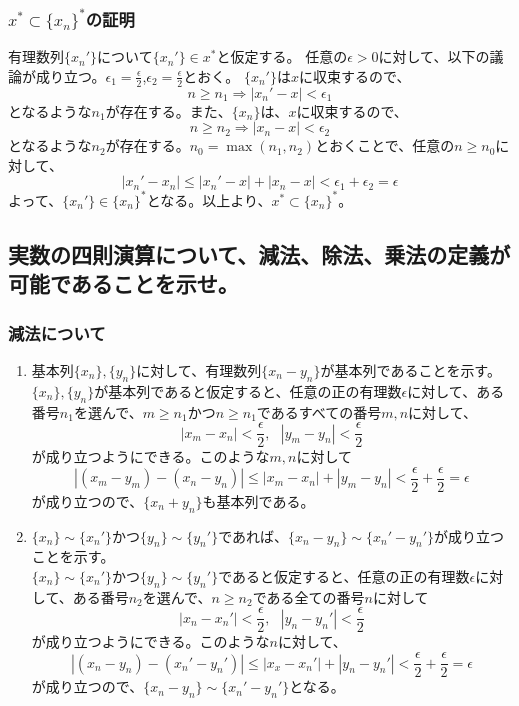 \documentclass{jsarticle}
\begin{document}
\subsubsection{$x^*\subset \{x_n\}^*$の証明}

有理数列$\{x_n'\}$について$\{x_n'\}\in x^*$と仮定する。
任意の$\epsilon>0$に対して、以下の議論が成り立つ。$\epsilon_1=\frac{\epsilon}{2}$,$\epsilon_2=\frac{\epsilon}{2}$とおく。
$\{x_n'\}$は$x$に収束するので、
\[n\geq n_1 \Longrightarrow|x_n'-x|<\epsilon_1\]
となるような$n_1$が存在する。また、$\{x_n\}$は、$x$に収束するので、
\[n\geq n_2 \Longrightarrow|x_n-x|<\epsilon_2\]
となるような$n_2$が存在する。$n_0=\max(n_1,n_2)$とおくことで、任意の$n\geq n_0$に対して、
\[|x_n'-x_n|\leq |x_n'-x|+|x_n-x| < \epsilon_1+\epsilon_2 =\epsilon\]
よって、$\{x_n'\}\in \{x_n\}^*$となる。以上より、$x^*\subset \{x_n\}^*$。



\subsection{実数の四則演算について、減法、除法、乗法の定義が可能であることを示せ。}
\subsubsection{減法について}
\begin{enumerate}
\item
基本列$\{x_n\},\{y_n\}$に対して、有理数列$\{x_n-y_n\}$が基本列であることを示す。\\
$\{x_n\},\{y_n\}$が基本列であると仮定すると、任意の正の有理数$\epsilon$に対して、ある番号$n_1$を選んで、$m\geq n_1$かつ$n\geq n_1$であるすべての番号$m,n$に対して、
\[|x_m-x_n|<\frac{\epsilon}{2},\ \ \ |y_m-y_n|<\frac{\epsilon}{2}\]
が成り立つようにできる。このような$m,n$に対して
\[|(x_m-y_m)-(x_n-y_n)|\leq|x_m-x_n|+|y_m-y_n|< \frac{\epsilon}{2}+\frac{\epsilon}{2}=\epsilon\]
が成り立つので、$\{x_n+y_n\}$も基本列である。

\item
$\{x_n\}\sim\{x_n'\}$かつ$\{y_n\}\sim\{y_n'\}$であれば、$\{x_n-y_n\}\sim\{x_n'-y_n'\}$が成り立つことを示す。\\
$\{x_n\}\sim\{x_n'\}$かつ$\{y_n\}\sim\{y_n'\}$であると仮定すると、任意の正の有理数$\epsilon$に対して、ある番号$n_2$を選んで、$n\geq n_2$である全ての番号$n$に対して
\[|x_n-x_n'|<\frac{\epsilon}{2},\ \ \ |y_n-y_n'|<\frac{\epsilon}{2}\]
が成り立つようにできる。このような$n$に対して、
\[|(x_n-y_n)-(x_n'-y_n')|\leq|x_x-x_n'|+|y_n-y_n'|< \frac{\epsilon}{2}+\frac{\epsilon}{2}=\epsilon\]
が成り立つので、$\{x_n-y_n\}\sim\{x_n'-y_n'\}$となる。
\end{enumerate}
\end{document}
